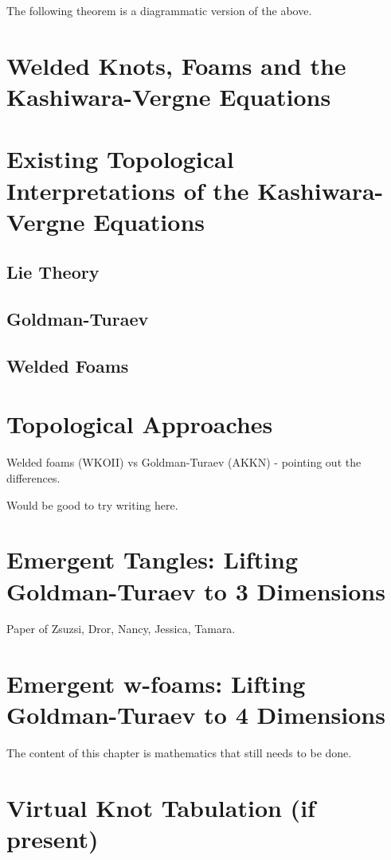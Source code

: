 \documentclass[12pt]{report}
\theoremstyle{regular}
\newcommand{\draftnote}[1]{
\begin{mdframed}[style=draftnote]
        {\color{Gray}{\scshape Note:} #1 }
\end{mdframed}
}
\newcommand{\scaffold}[1]{
\begin{mdframed}[style=scaffold]
        {\color{teal}#1}
\end{mdframed}
}
\begin{document}
        \scaffold{The following theorem is a diagrammatic version of the above.}

        \chapter{Welded Knots, Foams and the Kashiwara-Vergne Equations}

        \chapter{Existing Topological Interpretations of the Kashiwara-Vergne Equations}

        \section{Lie Theory}

        \section{Goldman-Turaev}

        \section{Welded Foams}

        \chapter{Topological Approaches}
        \scaffold{Welded foams (WKOII) vs Goldman-Turaev (AKKN) - pointing out the differences.}

        \draftnote{Would be good to try writing here.}

        \chapter{Emergent Tangles: Lifting Goldman-Turaev to 3 Dimensions}
        \scaffold{Paper of Zsuzsi, Dror, Nancy, Jessica, Tamara.}

        \chapter{Emergent w-foams: Lifting Goldman-Turaev to 4 Dimensions}
        \draftnote{The content of this chapter is mathematics that still needs to be done.}

        \chapter{Virtual Knot Tabulation (if present)}
\end{document}
